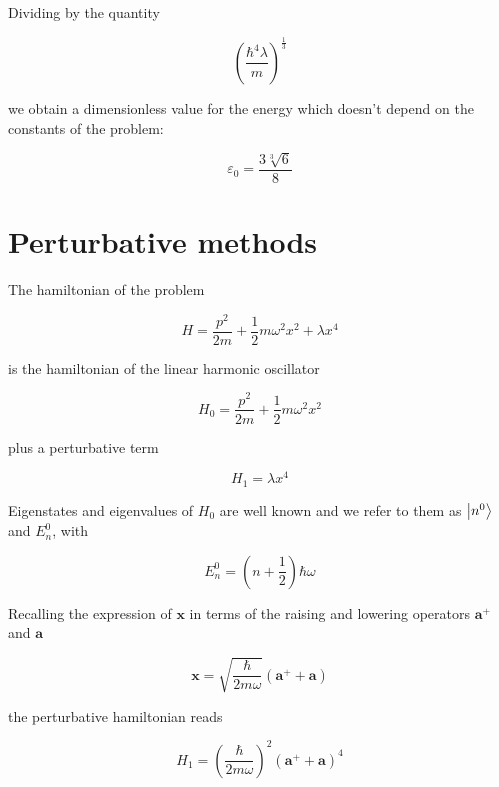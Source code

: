 \documentclass{article}
\begin{document}
Dividing by the quantity

\[ \left( \frac{\hbar^4 \lambda}{m} \right)^{\frac{1}{3}} \]

we obtain a dimensionless value for the energy which doesn't depend on the constants of the problem:

\begin{equation}
\varepsilon_0 = \frac{3\sqrt[3]{6}}{8}
\end{equation}

\section{Perturbative methods}

The hamiltonian of the problem 

\begin{equation}
H = \frac{p^2}{2m} + \frac{1}{2} m \omega^2 x^2 + \lambda x^4
\end{equation}

is the hamiltonian of the linear harmonic oscillator

\begin{equation}
H_0 = \frac{p^2}{2m} + \frac{1}{2} m \omega^2 x^2
\end{equation}

plus a perturbative term

\begin{equation}
H_1 = \lambda x^4
\end{equation}

Eigenstates and eigenvalues of \( H_0 \) are well known and we refer to them as \( \ket{n^0} \) and \( E_n^0 \), with

\begin{equation}
E_n^0 = \left(n + \frac{1}{2} \right) \hbar \omega
\end{equation}

Recalling the expression of \( \bm{x} \) in terms of the raising and lowering operators \( \bm{a^+} \) and \( \bm{a} \)

\begin{equation}
\label{eq:x_def}
\bm{x} = \sqrt{ \frac{\hbar}{2m \omega}} \left( \bm{a^+} + \bm{a} \right)
\end{equation}

the perturbative hamiltonian reads

\begin{equation}
H_1 = \left( \frac{\hbar}{2m \omega} \right)^2 \left( \bm{a^+} + \bm{a} \right)^4
\end{equation}
\end{document}
